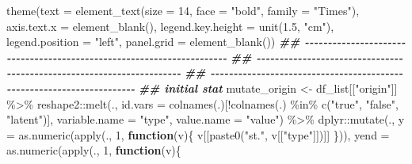 \documentclass[
]{article}
\newenvironment{Shaded}{\begin{snugshade}}{\end{snugshade}}
\newcommand{\AttributeTok}[1]{\textcolor[rgb]{0.77,0.63,0.00}{#1}}
\newcommand{\ControlFlowTok}[1]{\textcolor[rgb]{0.13,0.29,0.53}{\textbf{#1}}}
\newcommand{\DecValTok}[1]{\textcolor[rgb]{0.00,0.00,0.81}{#1}}
\newcommand{\DocumentationTok}[1]{\textcolor[rgb]{0.56,0.35,0.01}{\textbf{\textit{#1}}}}
\newcommand{\FloatTok}[1]{\textcolor[rgb]{0.00,0.00,0.81}{#1}}
\newcommand{\FunctionTok}[1]{\textcolor[rgb]{0.00,0.00,0.00}{#1}}
\newcommand{\NormalTok}[1]{#1}
\newcommand{\OtherTok}[1]{\textcolor[rgb]{0.56,0.35,0.01}{#1}}
\newcommand{\SpecialCharTok}[1]{\textcolor[rgb]{0.00,0.00,0.00}{#1}}
\newcommand{\StringTok}[1]{\textcolor[rgb]{0.31,0.60,0.02}{#1}}
\begin{document}
\begin{Shaded}
\begin{Highlighting}[]
      \FunctionTok{theme}\NormalTok{(}\AttributeTok{text =} \FunctionTok{element\_text}\NormalTok{(}\AttributeTok{size =} \DecValTok{14}\NormalTok{, }\AttributeTok{face =} \StringTok{"bold"}\NormalTok{, }\AttributeTok{family =} \StringTok{"Times"}\NormalTok{),}
            \AttributeTok{axis.text.x =} \FunctionTok{element\_blank}\NormalTok{(),}
            \AttributeTok{legend.key.height =} \FunctionTok{unit}\NormalTok{(}\FloatTok{1.5}\NormalTok{, }\StringTok{"cm"}\NormalTok{),}
            \AttributeTok{legend.position =} \StringTok{"left"}\NormalTok{,}
            \AttributeTok{panel.grid =} \FunctionTok{element\_blank}\NormalTok{())}
    \DocumentationTok{\#\# {-}{-}{-}{-}{-}{-}{-}{-}{-}{-}{-}{-}{-}{-}{-}{-}{-}{-}{-}{-}{-}{-}{-}{-}{-}{-}{-}{-}{-}{-}{-}{-}{-}{-}{-}{-}{-}{-}{-}{-}{-}{-}{-}{-}{-}{-}{-}{-}{-}{-}{-}{-}{-}{-}{-}{-}{-}{-}{-}{-}{-}{-}{-}{-}{-}{-}{-}{-}{-}{-} }
    \DocumentationTok{\#\# {-}{-}{-}{-}{-}{-}{-}{-}{-}{-}{-}{-}{-}{-}{-}{-}{-}{-}{-}{-}{-}{-}{-}{-}{-}{-}{-}{-}{-}{-}{-}{-}{-}{-}{-}{-}{-}{-}{-}{-}{-}{-}{-}{-}{-}{-}{-}{-}{-}{-}{-}{-}{-}{-}{-}{-}{-}{-}{-}{-}{-}{-}{-}{-}{-}{-}{-}{-}{-}{-} }
    \DocumentationTok{\#\# {-}{-}{-}{-}{-}{-}{-}{-}{-}{-}{-}{-}{-}{-}{-}{-}{-}{-}{-}{-}{-}{-}{-}{-}{-}{-}{-}{-}{-}{-}{-}{-}{-}{-}{-}{-}{-}{-}{-}{-}{-}{-}{-}{-}{-}{-}{-}{-}{-}{-}{-}{-}{-}{-}{-}{-}{-}{-}{-}{-}{-}{-}{-}{-}{-}{-}{-}{-}{-}{-} }
    \DocumentationTok{\#\# initial stat}
\NormalTok{    mutate\_origin }\OtherTok{\textless{}{-}}\NormalTok{ df\_list[[}\StringTok{"origin"}\NormalTok{]] }\SpecialCharTok{\%\textgreater{}\%} 
\NormalTok{      reshape2}\SpecialCharTok{::}\FunctionTok{melt}\NormalTok{(., }\AttributeTok{id.vars =} \FunctionTok{colnames}\NormalTok{(.)[}\SpecialCharTok{!}\FunctionTok{colnames}\NormalTok{(.) }\SpecialCharTok{\%in\%} \FunctionTok{c}\NormalTok{(}\StringTok{"true"}\NormalTok{, }\StringTok{"false"}\NormalTok{, }\StringTok{"latent"}\NormalTok{)],}
                     \AttributeTok{variable.name =} \StringTok{"type"}\NormalTok{,}
                     \AttributeTok{value.name =} \StringTok{"value"}\NormalTok{) }\SpecialCharTok{\%\textgreater{}\%} 
\NormalTok{    dplyr}\SpecialCharTok{::}\FunctionTok{mutate}\NormalTok{(., }\AttributeTok{y =} \FunctionTok{as.numeric}\NormalTok{(}\FunctionTok{apply}\NormalTok{(., }\DecValTok{1}\NormalTok{, }\ControlFlowTok{function}\NormalTok{(v)\{}
\NormalTok{                                            v[[}\FunctionTok{paste0}\NormalTok{(}\StringTok{"st."}\NormalTok{, v[[}\StringTok{"type"}\NormalTok{]])]]}
\NormalTok{                                                                      \})),}
                  \AttributeTok{yend =} \FunctionTok{as.numeric}\NormalTok{(}\FunctionTok{apply}\NormalTok{(., }\DecValTok{1}\NormalTok{, }\ControlFlowTok{function}\NormalTok{(v)\{}

\end{Highlighting}
\end{Shaded}
\end{document}
